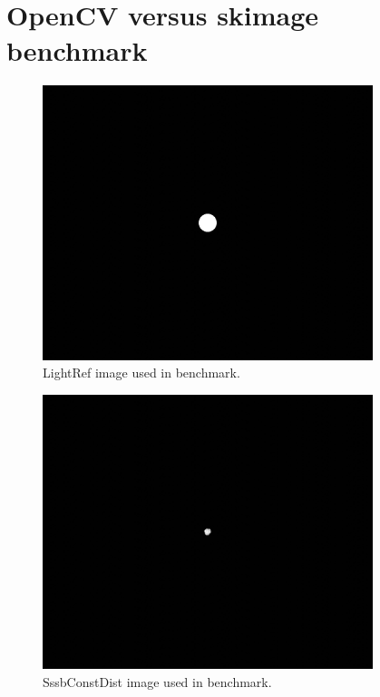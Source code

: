 \section{OpenCV versus \gls{skimage} benchmark} \label{sec:app_cvskimage}

\begin{figure}[htb]
    \begin{center}
        \includegraphics[height=8cm]{doc/thesis/0_figures/cv_skimage/LightRef_2017-08-15T115851-679000.jpg}
    \end{center}
    \caption{LightRef image used in benchmark.}
    \label{fig:bm_light_ref}
\end{figure}

\begin{figure}[htb]
    \begin{center}
        \includegraphics[height=8cm]{doc/thesis/0_figures/cv_skimage/SssbConstDist_2017-08-15T115851-679000.jpg}
    \end{center}
    \caption{SssbConstDist image used in benchmark.}
    \label{fig:bm_sssbconstdist}
\end{figure}

